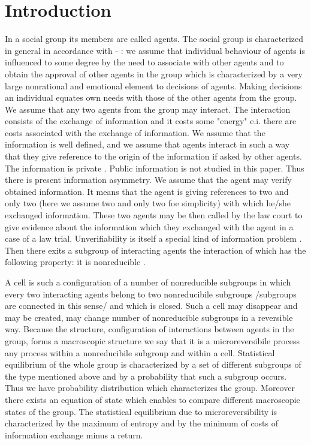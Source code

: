 \documentclass[10pt]{article}
\begin{document}
\newpage
\section{Introduction}

In a social group its members are called agents.
The social group is characterized in general in accordance with
\cite{1} - \cite{5}: we assume that individual behaviour
of agents is influenced to some degree by the need to associate
with other agents and to obtain the approval of other agents in
the group which is characterized by a very large nonrational
and emotional element to decisions of agents. Making
decisions an individual equates own needs with those
of the other agents from the group. We assume that any two agents from the group
may interact. The interaction consists of the exchange of information
and it costs some "energy" e.i. there are costs associated with the exchange of information. 
We assume that the information is well defined, and we
assume that agents interact in such a way that they give reference
to the origin of the information if asked by other agents.
The information is private \cite{6}. Public information is not studied in this paper.
Thus there is present information asymmetry.
We assume that the agent may verify obtained  information.
It means that the agent is giving references to two and only two (here we assume two and only two foe simplicity) with which he/she exchanged information. These two agents may be then called by the law court to give evidence about the information which they exchanged with the agent in a case of a law trial. Unverifiability is itself a special kind of information problem \cite{6}. Then there exits a subgroup of interacting agents the interaction
of which has the following property: it is nonreducible \cite{5}.


A cell is such a configuration of a number of nonreducible
subgroups in which every two interacting agents belong to two
nonreducibile subgroups /subgroups are connected in this sense/
and which is closed. Such a cell  may disappear and may be created,
may change number of nonreducible subgroups in a reversible way.
Because the structure, configuration of interactions between
agents in the group, forms a macroscopic structure we say that it is
a microreversibile process any process within a nonreducibile subgroup
and within a cell. Statistical equilibrium of the whole group
is characterized by a set of different subgroups of the type mentioned
above and by a probability that such a subgroup occurs. Thus we have
probability distribution which characterizes the group. Moreover
there exists an equation of state which enables to compare different
macroscopic states of the group. The statistical equilibrium due
to microreversibility is characterized by the maximum of entropy
and by the minimum of costs of information exchange minus a return.
\end{document}
